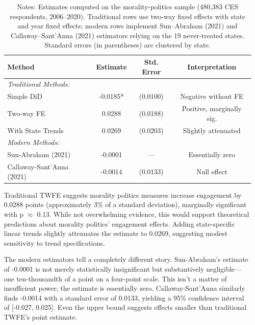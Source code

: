 \documentclass[12pt,letterpaper,oneside]{book}
\begin{document}
\begin{table}[H]
\centering
\caption{The Methodological Divergence: Traditional vs. Modern Estimators}
\label{tab:main_comparison}
\caption*{\footnotesize Notes: Estimates computed on the morality-politics sample (480{,}383 CES respondents, 2006--2020). Traditional rows use two-way fixed effects with state and year fixed effects; modern rows implement Sun--Abraham (2021) and Callaway--Sant'Anna (2021) estimators relying on the 19 never-treated states. Standard errors (in parentheses) are clustered by state.}
\begin{tabular}{lccc}
\hline\hline
Method & Estimate & Std. Error & Interpretation \\
\hline
\multicolumn{4}{l}{\textit{Traditional Methods:}} \\
Simple DiD & -0.0185* & (0.0100) & Negative without FE \\
Two-way FE & 0.0288 & (0.0188) & Positive, marginally sig. \\
With State Trends & 0.0269 & (0.0203) & Slightly attenuated \\
\hline
\multicolumn{4}{l}{\textit{Modern Methods:}} \\
Sun-Abraham (2021) & -0.0001 & --- & Essentially zero \\
Callaway-Sant'Anna (2021) & -0.0014 & (0.0133) & Null effect \\
\hline\hline
\end{tabular}
\end{table}

Traditional TWFE suggests morality politics measures increase engagement by 0.0288 points (approximately 3\% of a standard deviation), marginally significant with p $\approx$ 0.13. While not overwhelming evidence, this would support theoretical predictions about morality politics' engagement effects. Adding state-specific linear trends slightly attenuates the estimate to 0.0269, suggesting modest sensitivity to trend specifications.

The modern estimators tell a completely different story. Sun-Abraham's estimate of -0.0001 is not merely statistically insignificant but substantively negligible---one ten-thousandth of a point on a four-point scale. This isn't a matter of insufficient power; the estimate is essentially zero. Callaway-Sant'Anna similarly finds -0.0014 with a standard error of 0.0133, yielding a 95\% confidence interval of [-0.027, 0.025]. Even the upper bound suggests effects smaller than traditional TWFE's point estimate.
\end{document}
